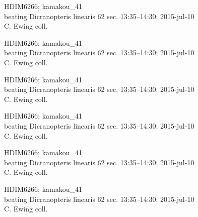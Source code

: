 \documentclass[2pt]{extarticle}
\begin{document}
\noindent
\parbox{0.16\textwidth}{\tiny \raggedright \rule[-0.3\baselineskip]{0pt}{10pt}HDIM6266; kamakou\_41\\ beating Dicranopteris linearis 62 sec. 13:35--14:30; 2015-jul-10\\ C. Ewing coll.}
\parbox{0.16\textwidth}{\tiny \raggedright \rule[-0.3\baselineskip]{0pt}{10pt}HDIM6266; kamakou\_41\\ beating Dicranopteris linearis 62 sec. 13:35--14:30; 2015-jul-10\\ C. Ewing coll.}
\parbox{0.16\textwidth}{\tiny \raggedright \rule[-0.3\baselineskip]{0pt}{10pt}HDIM6266; kamakou\_41\\ beating Dicranopteris linearis 62 sec. 13:35--14:30; 2015-jul-10\\ C. Ewing coll.}
\parbox{0.16\textwidth}{\tiny \raggedright \rule[-0.3\baselineskip]{0pt}{10pt}HDIM6266; kamakou\_41\\ beating Dicranopteris linearis 62 sec. 13:35--14:30; 2015-jul-10\\ C. Ewing coll.}
\parbox{0.16\textwidth}{\tiny \raggedright \rule[-0.3\baselineskip]{0pt}{10pt}HDIM6266; kamakou\_41\\ beating Dicranopteris linearis 62 sec. 13:35--14:30; 2015-jul-10\\ C. Ewing coll.}
\parbox{0.16\textwidth}{\tiny \raggedright \rule[-0.3\baselineskip]{0pt}{10pt}HDIM6266; kamakou\_41\\ beating Dicranopteris linearis 62 sec. 13:35--14:30; 2015-jul-10\\ C. Ewing coll.} \\ 
\vspace{0.001in} 
\end{document}
